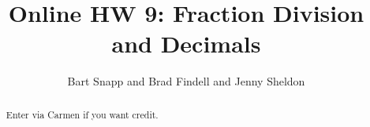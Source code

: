\documentclass[handout,space,nooutcomes]{xourse}
\title{Online HW 9: Fraction Division and Decimals}
\author{Bart Snapp and Brad Findell and Jenny Sheldon}
\begin{document}
\begin{abstract}
Enter via Carmen if you want credit.   
\end{abstract}
\maketitle


\end{document}
